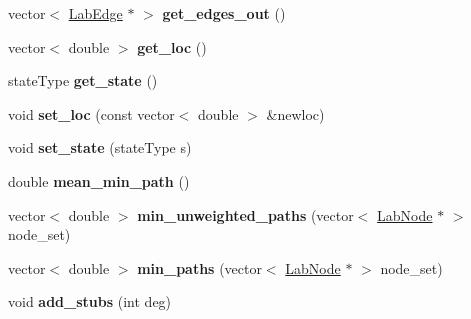 \begin{DoxyCompactItemize}
\item 
\hypertarget{classelps_1_1_lab_node_a92a1d90fa84013b36f3c88ec1e5f7002}{vector$<$ \hyperlink{classelps_1_1_lab_edge}{Lab\+Edge} $\ast$ $>$ {\bfseries get\+\_\+edges\+\_\+out} ()}\label{classelps_1_1_lab_node_a92a1d90fa84013b36f3c88ec1e5f7002}

\item 
\hypertarget{classelps_1_1_lab_node_aca511d202930050a70e272e1dd783587}{vector$<$ double $>$ {\bfseries get\+\_\+loc} ()}\label{classelps_1_1_lab_node_aca511d202930050a70e272e1dd783587}

\item 
\hypertarget{classelps_1_1_lab_node_a8798fbe4bae0f64c7d8d89f21b5d0b92}{state\+Type {\bfseries get\+\_\+state} ()}\label{classelps_1_1_lab_node_a8798fbe4bae0f64c7d8d89f21b5d0b92}

\item 
\hypertarget{classelps_1_1_lab_node_a95a508011aefe8a1113cb698bc44836f}{void {\bfseries set\+\_\+loc} (const vector$<$ double $>$ \&newloc)}\label{classelps_1_1_lab_node_a95a508011aefe8a1113cb698bc44836f}

\item 
\hypertarget{classelps_1_1_lab_node_a65f1edff5a432ca98cdeadac9bac23e6}{void {\bfseries set\+\_\+state} (state\+Type s)}\label{classelps_1_1_lab_node_a65f1edff5a432ca98cdeadac9bac23e6}

\item 
\hypertarget{classelps_1_1_lab_node_a928c359748576ff6f3084dceb984b35d}{double {\bfseries mean\+\_\+min\+\_\+path} ()}\label{classelps_1_1_lab_node_a928c359748576ff6f3084dceb984b35d}

\item 
\hypertarget{classelps_1_1_lab_node_a11129851b15864de37bf1c2313c967c3}{vector$<$ double $>$ {\bfseries min\+\_\+unweighted\+\_\+paths} (vector$<$ \hyperlink{classelps_1_1_lab_node}{Lab\+Node} $\ast$ $>$ node\+\_\+set)}\label{classelps_1_1_lab_node_a11129851b15864de37bf1c2313c967c3}

\item 
\hypertarget{classelps_1_1_lab_node_a17ba6f7c6a341798f4f7f56fa5c1f606}{vector$<$ double $>$ {\bfseries min\+\_\+paths} (vector$<$ \hyperlink{classelps_1_1_lab_node}{Lab\+Node} $\ast$ $>$ node\+\_\+set)}\label{classelps_1_1_lab_node_a17ba6f7c6a341798f4f7f56fa5c1f606}

\item 
\hypertarget{classelps_1_1_lab_node_a7b01daee54561be5e623ad4f3c57c1f2}{void {\bfseries add\+\_\+stubs} (int deg)}\label{classelps_1_1_lab_node_a7b01daee54561be5e623ad4f3c57c1f2}


\end{DoxyCompactItemize}

